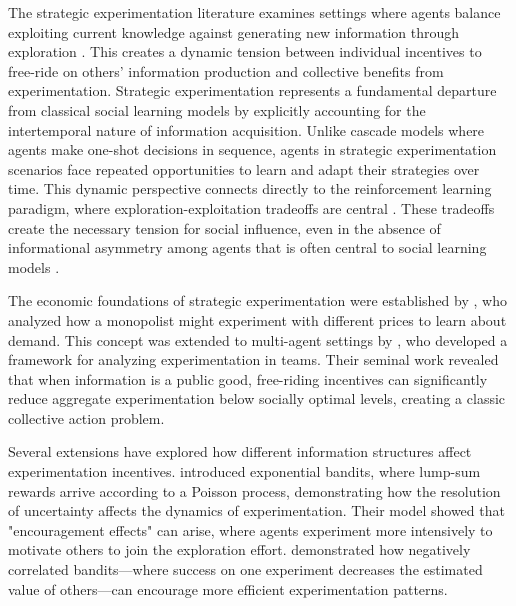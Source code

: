 \documentclass[a4paper,12pt]{report}
\begin{document}
The strategic experimentation literature examines settings where agents balance exploiting current knowledge against generating new information through exploration \citep{bolton1999strategic, keller2005strategic}. This creates a dynamic tension between individual incentives to free-ride on others' information production and collective benefits from experimentation. Strategic experimentation represents a fundamental departure from classical social learning models by explicitly accounting for the intertemporal nature of information acquisition. Unlike cascade models where agents make one-shot decisions in sequence, agents in strategic experimentation scenarios face repeated opportunities to learn and adapt their strategies over time. This dynamic perspective connects directly to the reinforcement learning paradigm, where exploration-exploitation tradeoffs are central \citep{sutton2018reinforcement}. These tradeoffs create the necessary tension for social influence, even in the absence of informational asymmetry among agents that is often central to social learning models \citep{gale2003bayesian}.

The economic foundations of strategic experimentation were established by \citet{rothschild1974two}, who analyzed how a monopolist might experiment with different prices to learn about demand. This concept was extended to multi-agent settings by \citet{bolton1999strategic}, who developed a framework for analyzing experimentation in teams. Their seminal work revealed that when information is a public good, free-riding incentives can significantly reduce aggregate experimentation below socially optimal levels, creating a classic collective action problem.

Several extensions have explored how different information structures affect experimentation incentives. \citet{keller2005strategic} introduced exponential bandits, where lump-sum rewards arrive according to a Poisson process, demonstrating how the resolution of uncertainty affects the dynamics of experimentation. Their model showed that "encouragement effects" can arise, where agents experiment more intensively to motivate others to join the exploration effort. \citet{klein2011negatively} demonstrated how negatively correlated bandits—where success on one experiment decreases the estimated value of others—can encourage more efficient experimentation patterns.

\end{document}
